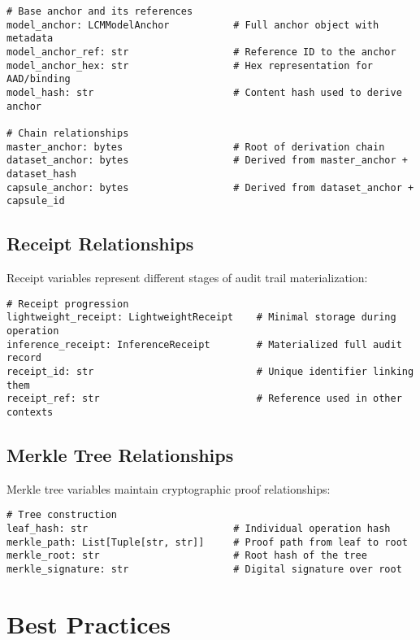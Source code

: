 \documentclass[12pt,a4paper]{article}
\begin{document}
\begin{lstlisting}[caption=Anchor Hierarchy]
# Base anchor and its references
model_anchor: LCMModelAnchor           # Full anchor object with metadata
model_anchor_ref: str                  # Reference ID to the anchor
model_anchor_hex: str                  # Hex representation for AAD/binding
model_hash: str                        # Content hash used to derive anchor

# Chain relationships
master_anchor: bytes                   # Root of derivation chain
dataset_anchor: bytes                  # Derived from master_anchor + dataset_hash
capsule_anchor: bytes                  # Derived from dataset_anchor + capsule_id
\end{lstlisting}

\subsection{Receipt Relationships}

Receipt variables represent different stages of audit trail materialization:

\begin{lstlisting}[caption=Receipt Progression]
# Receipt progression
lightweight_receipt: LightweightReceipt    # Minimal storage during operation
inference_receipt: InferenceReceipt        # Materialized full audit record
receipt_id: str                            # Unique identifier linking them
receipt_ref: str                           # Reference used in other contexts
\end{lstlisting}

\subsection{Merkle Tree Relationships}

Merkle tree variables maintain cryptographic proof relationships:

\begin{lstlisting}[caption=Merkle Tree Structure]
# Tree construction
leaf_hash: str                         # Individual operation hash
merkle_path: List[Tuple[str, str]]     # Proof path from leaf to root
merkle_root: str                       # Root hash of the tree
merkle_signature: str                  # Digital signature over root
\end{lstlisting}

\section{Best Practices}
\end{document}

